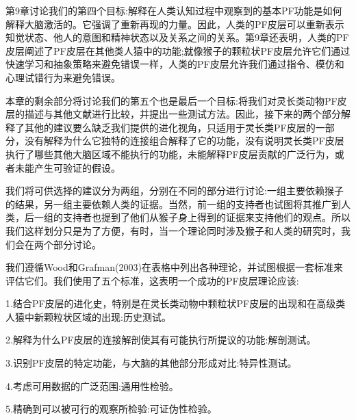 第9章讨论我们的第四个目标:解释在人类认知过程中观察到的基本PF功能是如何解释大脑激活的。它强调了重新再现的力量。因此，人类的PF皮层可以重新表示知觉状态、他人的意图和精神状态以及关系之间的关系。第9章还表明，人类的PF皮层阐述了PF皮层在其他类人猿中的功能;就像猴子的颗粒状PF皮层允许它们通过快速学习和抽象策略来避免错误一样，人类的PF皮层允许我们通过指令、模仿和心理试错行为来避免错误。
\par 
本章的剩余部分将讨论我们的第五个也是最后一个目标:将我们对灵长类动物PF皮层的描述与其他文献进行比较，并提出一些测试方法。因此，接下来的两个部分解释了其他的建议要么缺乏我们提供的进化视角，只适用于灵长类PF皮层的一部分，没有解释为什么它独特的连接组合解释了它的功能，没有说明灵长类PF皮层执行了哪些其他大脑区域不能执行的功能，未能解释PF皮层贡献的广泛行为，或者未能产生可验证的假设。
\par 
我们将可供选择的建议分为两组，分别在不同的部分进行讨论:一组主要依赖猴子的结果，另一组主要依赖人类的证据。当然，前一组的支持者也试图将其推广到人类，后一组的支持者也提到了他们从猴子身上得到的证据来支持他们的观点。所以我们这样划分只是为了方便，有时，当一个理论同时涉及猴子和人类的研究时，我们会在两个部分讨论。
\par 
我们遵循Wood和Grafman(2003)在表格中列出各种理论，并试图根据一套标准来评估它们。我们使用了五个标准，这表明一个成功的PF皮层理论应该:
\par 
1.结合PF皮层的进化史，特别是在灵长类动物中颗粒状PF皮层的出现和在高级类人猿中新颗粒状区域的出现:历史测试。
\par 
2.解释为什么PF皮层的连接解剖使其有可能执行所提议的功能:解剖测试。
\par 
3.识别PF皮层的特定功能，与大脑的其他部分形成对比:特异性测试。
\par 
4.考虑可用数据的广泛范围:通用性检验。
\par 
5.精确到可以被可行的观察所检验:可证伪性检验。
